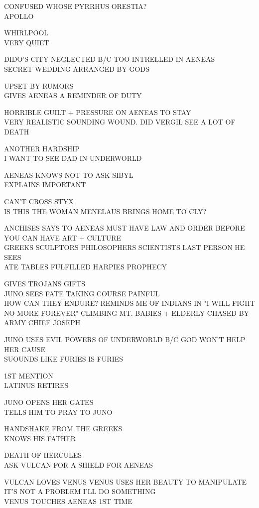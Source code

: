 \documentclass[10pt,letterpaper]{article}
\begin{document}
CONFUSED WHOSE PYRRHUS ORESTIA?\\
APOLLO

WHIRLPOOL\\
VERY QUIET

DIDO'S CITY NEGLECTED B/C TOO INTRELLED IN AENEAS\\
SECRET WEDDING ARRANGED BY GODS

UPSET BY RUMORS\\
GIVES AENEAS A REMINDER OF DUTY

HORRIBLE GUILT + PRESSURE ON AENEAS TO STAY\\
VERY REALISTIC SOUNDING WOUND.  DID VERGIL SEE A LOT OF DEATH

ANOTHER HARDSHIP\\
I WANT TO SEE DAD IN UNDERWORLD

AENEAS KNOWS NOT TO ASK SIBYL\\
EXPLAINS IMPORTANT

CAN'T CROSS STYX\\
IS THIS THE WOMAN MENELAUS BRINGS HOME TO CLY?

ANCHISES SAYS TO AENEAS MUST HAVE LAW AND ORDER BEFORE YOU CAN HAVE ART + CULTURE\\
GREEKS SCULPTORS PHILOSOPHERS SCIENTISTS LAST PERSON HE SEES\\
ATE TABLES FULFILLED HARPIES PROPHECY

GIVES TROJANS GIFTS\\
JUNO SEES FATE TAKING COURSE PAINFUL\\
HOW CAN THEY ENDURE?  REMINDS ME OF INDIANS IN "I WILL FIGHT NO MORE FOREVER" CLIMBING MT. BABIES + ELDERLY CHASED BY ARMY CHIEF JOSEPH

JUNO USES EVIL POWERS OF UNDERWORLD B/C GOD WON'T HELP HER CAUSE\\
SUOUNDS LIKE FURIES IS FURIES

1ST MENTION\\
LATINUS RETIRES

JUNO OPENS HER GATES\\
TELLS HIM TO PRAY TO JUNO

HANDSHAKE FROM THE GREEKS\\
KNOWS HIS FATHER

DEATH OF HERCULES\\
ASK VULCAN FOR A SHIELD FOR AENEAS

VULCAN LOVES VENUS VENUS USES HER BEAUTY TO MANIPULATE IT'S NOT A PROBLEM I'LL DO SOMETHING\\
VENUS TOUCHES AENEAS 1ST TIME
\end{document}
